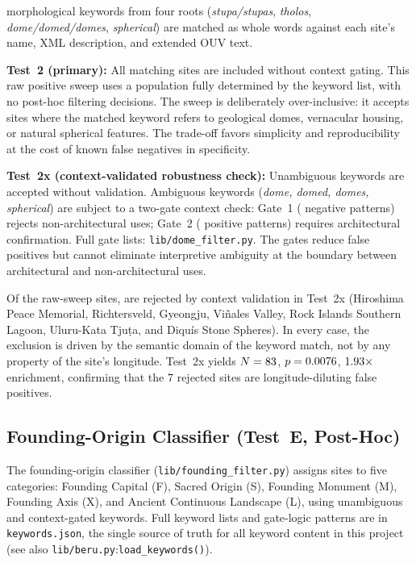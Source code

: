 \documentclass[HARVARD,twocolumn]{USG}
\begin{document}
\NcircKeywords{} morphological keywords from four roots
(\textit{stupa/stupas}, \textit{tholos}, \textit{dome/domed/domes},
\textit{spherical}) are matched as whole words against each site's
name, XML description, and extended OUV text.

\textbf{Test~2 (primary):} All \NcircTotal{} matching sites are included
without context gating. This raw positive sweep uses a population fully
determined by the keyword list, with no post-hoc filtering decisions.
The sweep is deliberately over-inclusive: it accepts sites where the
matched keyword refers to geological domes, vernacular housing, or
natural spherical features. The trade-off favors simplicity and
reproducibility at the cost of known false negatives in specificity.

\textbf{Test~2x (context-validated robustness check):} Unambiguous keywords
are accepted without validation. Ambiguous keywords (\textit{dome, domed,
domes, spherical}) are subject to a two-gate context check: Gate~1
(\NdomeGateNeg{} negative patterns) rejects non-architectural uses; Gate~2
(\NdomeGatePos{} positive patterns) requires architectural confirmation. Full gate
lists: \texttt{lib/dome\_filter.py}. The gates reduce false positives
but cannot eliminate interpretive ambiguity at the boundary between
architectural and non-architectural uses.

Of the \NcircTotal{} raw-sweep sites, \NcircContextRejected{} are
rejected by context validation in Test~2x (Hiroshima Peace Memorial,
Richtersveld, Gyeongju, Vi\~{n}ales Valley, Rock Islands Southern Lagoon,
Uluru-Kata Tju\d{t}a, and Diqu\'{i}s Stone Spheres). In every case, the
exclusion is driven by the semantic domain of the keyword match, not by
any property of the site's longitude. Test~2x yields $N = 83$,
$p = 0.0076$, $1.93\times$ enrichment, confirming that the 7 rejected
sites are longitude-diluting false positives.

\subsection{Founding-Origin Classifier (Test~E, Post-Hoc)}
\label{sec:kwdaudit_founding}

The founding-origin classifier (\texttt{lib/founding\_filter.py})
assigns sites to five categories: Founding Capital (F), Sacred Origin
(S), Founding Monument (M), Founding Axis (X), and Ancient Continuous
Landscape (L), using unambiguous and context-gated keywords. Full
keyword lists and gate-logic patterns are in \texttt{keywords.json},
the single source of truth for all keyword content in this project
(see also \texttt{lib/beru.py}:\texttt{load\_keywords()}).
\end{document}
